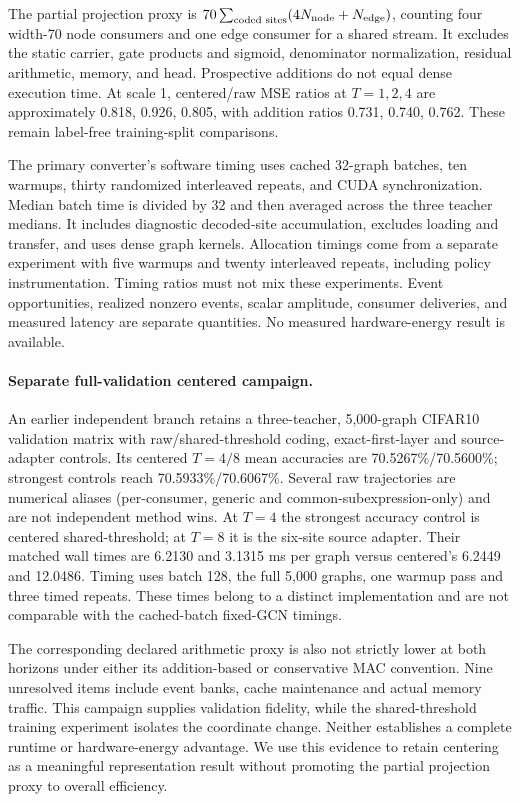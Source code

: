 \documentclass[10pt,twocolumn,letterpaper]{article}
\begin{document}
The partial projection proxy is $70\sum_{\text{coded sites}}(4N_{\rm node}+N_{\rm edge})$, counting four width-70 node consumers and one edge consumer for a shared stream. It excludes the static carrier, gate products and sigmoid, denominator normalization, residual arithmetic, memory, and head. Prospective additions do not equal dense execution time. At scale 1, centered/raw MSE ratios at $T=1,2,4$ are approximately 0.818, 0.926, 0.805, with addition ratios 0.731, 0.740, 0.762. These remain label-free training-split comparisons.

The primary converter's software timing uses cached 32-graph batches, ten warmups, thirty randomized interleaved repeats, and CUDA synchronization. Median batch time is divided by 32 and then averaged across the three teacher medians. It includes diagnostic decoded-site accumulation, excludes loading and transfer, and uses dense graph kernels. Allocation timings come from a separate experiment with five warmups and twenty interleaved repeats, including policy instrumentation. Timing ratios must not mix these experiments. Event opportunities, realized nonzero events, scalar amplitude, consumer deliveries, and measured latency are separate quantities. No measured hardware-energy result is available.

\paragraph{Separate full-validation centered campaign.}
An earlier independent branch retains a three-teacher, 5,000-graph CIFAR10 validation matrix with raw/shared-threshold coding, exact-first-layer and source-adapter controls. Its centered $T=4/8$ mean accuracies are 70.5267\%/70.5600\%; strongest controls reach 70.5933\%/70.6067\%. Several raw trajectories are numerical aliases (per-consumer, generic and common-subexpression-only) and are not independent method wins. At $T=4$ the strongest accuracy control is centered shared-threshold; at $T=8$ it is the six-site source adapter. Their matched wall times are 6.2130 and 3.1315 ms per graph versus centered's 6.2449 and 12.0486. Timing uses batch 128, the full 5,000 graphs, one warmup pass and three timed repeats. These times belong to a distinct implementation and are not comparable with the cached-batch fixed-GCN timings.

The corresponding declared arithmetic proxy is also not strictly lower at both horizons under either its addition-based or conservative MAC convention. Nine unresolved items include event banks, cache maintenance and actual memory traffic. This campaign supplies validation fidelity, while the shared-threshold training experiment isolates the coordinate change. Neither establishes a complete runtime or hardware-energy advantage. We use this evidence to retain centering as a meaningful representation result without promoting the partial projection proxy to overall efficiency.
\end{document}

